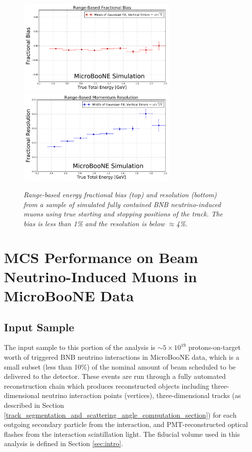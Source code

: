 \documentclass[a4paper,11pt]{article}
\begin{document}
\begin{figure}
\centering
\includegraphics[width=0.7\textwidth]
	{Figures/true_range_bias_MCBNBMCTrack.png}
\includegraphics[width=0.7\textwidth]
	{Figures/true_range_resolution_MCBNBMCTrack.png}
\caption{\textit{Range-based energy fractional bias (top) and resolution (bottom) from a sample of simulated fully contained BNB neutrino-induced muons using true starting and stopping positions of the track. The bias is less than 1\% and the resolution is below $\approx$4\%.}}
\label{true_range_bias_resolution_MCTrack_fig}
\end{figure}






\section{MCS Performance on Beam Neutrino-Induced Muons in MicroBooNE Data}\label{data_performance_section}

\subsection{Input Sample}\label{input_sample_section}
The input sample to this portion of the analysis is $\sim 5 \times 10^{19}$ protons-on-target worth of triggered BNB neutrino interactions in MicroBooNE data, which is a small subset (less than 10\%) of the nominal amount of beam scheduled to be delivered to the detector. These events are run through a fully automated reconstruction chain which produces reconstructed objects including three-dimensional neutrino interaction points (vertices), three-dimensional tracks (as described in Section \ref{track_segmentation_and_scattering_angle_computation_section}) for each outgoing secondary particle from the interaction, and PMT-reconstructed optical flashes from the interaction scintillation light. The fiducial volume used in this analysis is defined in Section \ref{sec:intro}.
\end{document}
